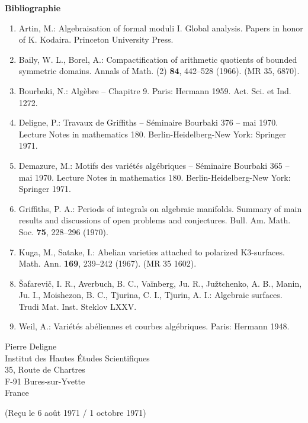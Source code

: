 \documentclass[10pt]{article}
\begin{document}
\begin{center}
\bfseries Bibliographie
\end{center}
\begin{enumerate}[label=\arabic*.]
\item Artin, M.: Algebraisation of formal moduli I. Global analysis. Papers in honor of K. Kodaira. Princeton University Press.
\item Baily, W. L., Borel, A.: Compactification of arithmetic quotients of bounded symmetric domains. Annals of Math. (2) \textbf{84}, 442--528 (1966). (MR 35, 6870).
\item Bourbaki, N.: Algèbre -- Chapitre 9. Paris: Hermann 1959. Act. Sci. et Ind. 1272.
\item Deligne, P.: Travaux de Griffiths -- Séminaire Bourbaki 376 -- mai 1970. Lecture Notes in mathematics 180. Berlin-Heidelberg-New York: Springer 1971.
\item Demazure, M.: Motifs des variétés algébriques -- Séminaire Bourbaki 365 -- mai 1970. Lecture Notes in mathematics 180. Berlin-Heidelberg-New York: Springer 1971.
\item Griffiths, P. A.: Periods of integrals on algebraic manifolds. Summary of main results and discussions of open problems and conjectures. Bull. Am. Math. Soc. \textbf{75}, 228--296 (1970).
\item Kuga, M., Satake, I.: Abelian varieties attached to polarized K3-surfaces. Math. Ann. \textbf{169}, 239--242 (1967). (MR 35 1602).
\item Šafarevič, I. R., Averbuch, B. C., Vaĭnberg, Ju. R., Južtchenko, A. B., Manin, Ju. I., Moishezon, B. C., Tjurina, C. I., Tjurin, A. I.: Algebraic surfaces. Trudi Mat. Inst. Steklov LXXV.
\item Weil, A.: Variétés abéliennes et courbes algébriques. Paris: Hermann 1948.
\end{enumerate}

\begin{flushright}
Pierre Deligne\\
Institut des Hautes Études Scientifiques\\
35, Route de Chartres\\
F-91 Bures-sur-Yvette\\
France
\end{flushright}

\begin{center}
(Reçu le 6 août 1971 / 1 octobre 1971)
\end{center}
\end{document}
